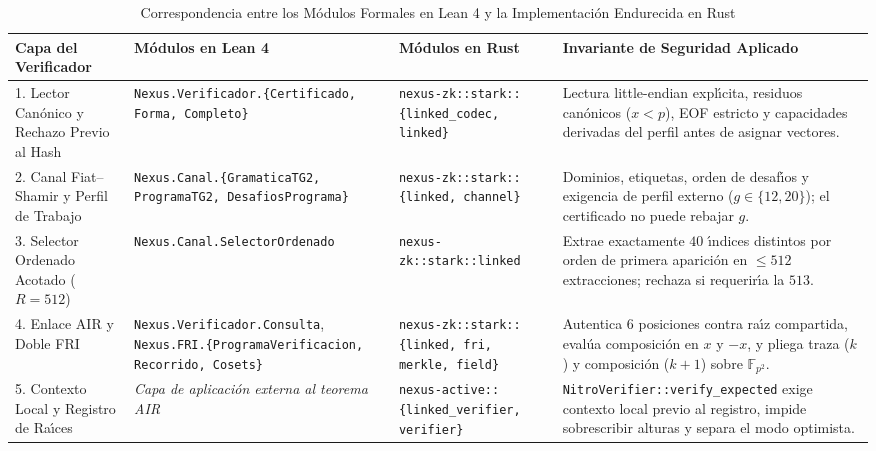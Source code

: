 \documentclass[conference]{IEEEtran}
\theoremstyle{definition}
\begin{document}
\begin{table}[t]
\centering
\caption{Correspondencia entre los M\'{o}dulos Formales en Lean 4 y la Implementaci\'{o}n Endurecida en Rust}
\label{tab:alignment}
\footnotesize
\begin{tabular}{@{}p{2.9cm}p{4.1cm}p{3.9cm}p{5.1cm}@{}}
\toprule
\textbf{Capa del Verificador} & \textbf{M\'{o}dulos en Lean 4} & \textbf{M\'{o}dulos en Rust} & \textbf{Invariante de Seguridad Aplicado} \\
\midrule
\raggedright 1. Lector Can\'{o}nico y Rechazo Previo al Hash & \raggedright\texttt{Nexus.Verificador.\allowbreak\{Certificado, Forma, Completo\}} & \raggedright\texttt{nexus-zk::stark::\allowbreak\{linked\_codec, linked\}} & Lectura little-endian expl\'{\i}cita, residuos can\'{o}nicos ($x < p$), EOF estricto y capacidades derivadas del perfil antes de asignar vectores. \\
\addlinespace[2pt]
\raggedright 2. Canal Fiat--Shamir y Perfil de Trabajo & \raggedright\texttt{Nexus.Canal.\allowbreak\{GramaticaTG2, ProgramaTG2, DesafiosPrograma\}} & \raggedright\texttt{nexus-zk::stark::\allowbreak\{linked, channel\}} & Dominios, etiquetas, orden de desaf\'{\i}os y exigencia de perfil externo ($g \in \{12, 20\}$); el certificado no puede rebajar $g$. \\
\addlinespace[2pt]
\raggedright 3. Selector Ordenado Acotado ($R = 512$) & \raggedright\texttt{Nexus.Canal.\allowbreak SelectorOrdenado} & \raggedright\texttt{nexus-zk::stark::\allowbreak linked} & Extrae exactamente $40$ \'{\i}ndices distintos por orden de primera aparici\'{o}n en $\le 512$ extracciones; rechaza si requerir\'{\i}a la $513$. \\
\addlinespace[2pt]
\raggedright 4. Enlace AIR y Doble FRI & \raggedright\texttt{Nexus.Verificador.Consulta}, \texttt{Nexus.FRI.\allowbreak\{ProgramaVerificacion, Recorrido, Cosets\}} & \raggedright\texttt{nexus-zk::stark::\allowbreak\{linked, fri, merkle, field\}} & Autentica $6$ posiciones contra ra\'{\i}z compartida, eval\'{u}a composici\'{o}n en $x$ y $-x$, y pliega traza ($k$) y composici\'{o}n ($k+1$) sobre $\mathbb{F}_{p^2}$. \\
\addlinespace[2pt]
\raggedright 5. Contexto Local y Registro de Ra\'{\i}ces & \raggedright\textit{Capa de aplicaci\'{o}n externa al teorema AIR} & \raggedright\texttt{nexus-active::\allowbreak\{linked\_verifier, verifier\}} & \texttt{NitroVerifier::verify\_expected} exige contexto local previo al registro, impide sobrescribir alturas y separa el modo optimista. \\
\bottomrule
\end{tabular}
\end{table}
\end{document}
